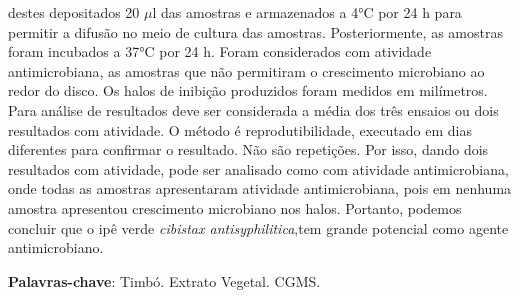 \documentclass[article,12pt,onesidea,4paper,english,brazil]{abntex2}
\begin{document}
	destes depositados 20 $\mu$l das amostras e armazenados a 4°C por 24 h para permitir
	a difusão no meio de cultura das amostras. Posteriormente, as amostras foram
	incubados a 37°C por 24 h. Foram considerados com atividade antimicrobiana, as
	amostras que não permitiram o crescimento microbiano ao redor do disco. Os halos
	de inibição produzidos foram medidos em milímetros. Para análise de
	resultados deve ser considerada a média dos três ensaios ou dois resultados com
	atividade. O método é reprodutibilidade, executado em dias diferentes para
	confirmar o resultado. Não são repetições. Por isso, dando dois resultados com
	atividade, pode ser analisado como com atividade antimicrobiana, onde todas as
	amostras apresentaram atividade antimicrobiana, pois em nenhuma amostra
	apresentou crescimento microbiano nos halos. Portanto, podemos
	concluir que o ipê verde \textit{cibistax antisyphilitica},tem grande potencial como agente
	antimicrobiano.
	
	\vspace{\onelineskip}
	
	\noindent
	\textbf{Palavras-chave}: Timbó. Extrato Vegetal. CGMS.	
	
\end{document}
